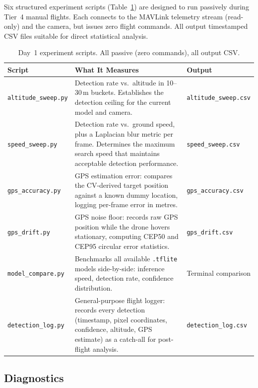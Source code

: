 Six structured experiment scripts (Table~\ref{tab:experiment-scripts}) are designed to run passively during Tier~4 manual flights.  Each connects to the MAVLink telemetry stream (read-only) and the camera, but issues zero flight commands.  All output timestamped CSV files suitable for direct statistical analysis.

\begin{table}[H]
\centering
\caption{Day~1 experiment scripts.  All passive (zero commands), all output CSV.}
\label{tab:experiment-scripts}
\small
\begin{tabular}{@{}lp{4.5cm}p{4.5cm}@{}}
\toprule
\textbf{Script} & \textbf{What It Measures} & \textbf{Output} \\
\midrule
\texttt{altitude\_sweep.py} & Detection rate vs.\ altitude in 10--30\,m buckets.  Establishes the detection ceiling for the current model and camera. & \texttt{altitude\_sweep.csv} \\
\addlinespace
\texttt{speed\_sweep.py} & Detection rate vs.\ ground speed, plus a Laplacian blur metric per frame.  Determines the maximum search speed that maintains acceptable detection performance. & \texttt{speed\_sweep.csv} \\
\addlinespace
\texttt{gps\_accuracy.py} & GPS estimation error: compares the CV-derived target position against a known dummy location, logging per-frame error in metres. & \texttt{gps\_accuracy.csv} \\
\addlinespace
\texttt{gps\_drift.py} & GPS noise floor: records raw GPS position while the drone hovers stationary, computing CEP50 and CEP95 circular error statistics. & \texttt{gps\_drift.csv} \\
\addlinespace
\texttt{model\_compare.py} & Benchmarks all available \texttt{.tflite} models side-by-side: inference speed, detection rate, confidence distribution. & Terminal comparison \\
\addlinespace
\texttt{detection\_log.py} & General-purpose flight logger: records every detection (timestamp, pixel coordinates, confidence, altitude, GPS estimate) as a catch-all for post-flight analysis. & \texttt{detection\_log.csv} \\
\bottomrule
\end{tabular}
\end{table}

\subsection{Diagnostics}\label{sec:diag-scripts}

